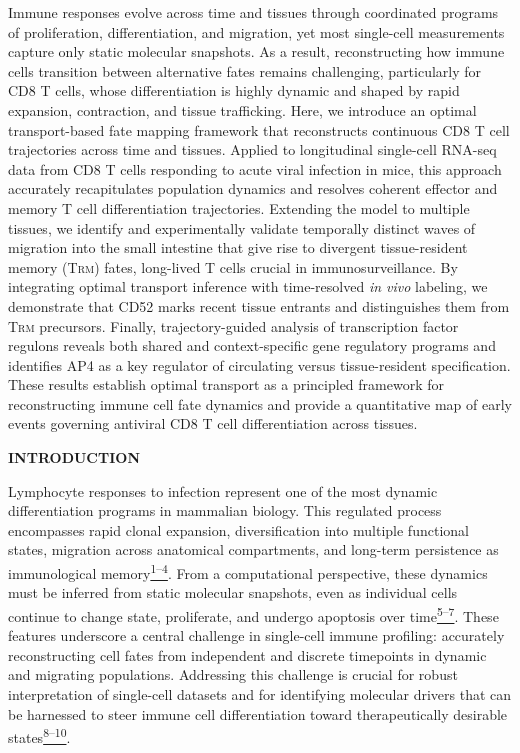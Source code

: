Immune responses evolve across time and tissues through coordinated
programs of proliferation, differentiation, and migration, yet most
single-cell measurements capture only static molecular snapshots. As a
result, reconstructing how immune cells transition between alternative
fates remains challenging, particularly for CD8 T cells, whose
differentiation is highly dynamic and shaped by rapid expansion,
contraction, and tissue trafficking. Here, we introduce an optimal
transport-based fate mapping framework that reconstructs continuous CD8
T cell trajectories across time and tissues. Applied to longitudinal
single-cell RNA-seq data from CD8 T cells responding to acute viral
infection in mice, this approach accurately recapitulates population
dynamics and resolves coherent effector and memory T cell
differentiation trajectories. Extending the model to multiple tissues,
we identify and experimentally validate temporally distinct waves of
migration into the small intestine that give rise to divergent
tissue-resident memory (T\textsc{rm}) fates, long-lived T cells crucial
in immunosurveillance. By integrating optimal transport inference with
time-resolved \emph{in vivo} labeling, we demonstrate that CD52 marks
recent tissue entrants and distinguishes them from T\textsc{rm}
precursors. Finally, trajectory-guided analysis of transcription factor
regulons reveals both shared and context-specific gene regulatory
programs and identifies AP4 as a key regulator of circulating versus
tissue-resident specification. These results establish optimal transport
as a principled framework for reconstructing immune cell fate dynamics
and provide a quantitative map of early events governing antiviral CD8 T
cell differentiation across tissues.

\textbf{INTRODUCTION}

Lymphocyte responses to infection represent one of the most dynamic
differentiation programs in mammalian biology. This regulated process
encompasses rapid clonal expansion, diversification into multiple
functional states, migration across anatomical compartments, and
long-term persistence as immunological
memory\href{https://sciwheel.com/work/citation?ids=1306567,15592036,8929852,100389\&pre=\&pre=\&pre=\&pre=\&suf=\&suf=\&suf=\&suf=\&sa=0,0,0,0\&dbf=0\&dbf=0\&dbf=0\&dbf=0}{\textsuperscript{1--4}}.
From a computational perspective, these dynamics must be inferred from
static molecular snapshots, even as individual cells continue to change
state, proliferate, and undergo apoptosis over
time\href{https://sciwheel.com/work/citation?ids=18537397,10552252,7598004\&pre=\&pre=\&pre=\&suf=\&suf=\&suf=\&sa=0,0,0\&dbf=0\&dbf=0\&dbf=0}{\textsuperscript{5--7}}.
These features underscore a central challenge in single-cell immune
profiling: accurately reconstructing cell fates from independent and
discrete timepoints in dynamic and migrating populations. Addressing
this challenge is crucial for robust interpretation of single-cell
datasets and for identifying molecular drivers that can be harnessed to
steer immune cell differentiation toward therapeutically desirable
states\href{https://sciwheel.com/work/citation?ids=18384638,17494421,18201304\&pre=\&pre=\&pre=\&suf=\&suf=\&suf=\&sa=0,0,0\&dbf=0\&dbf=0\&dbf=0}{\textsuperscript{8--10}}.

